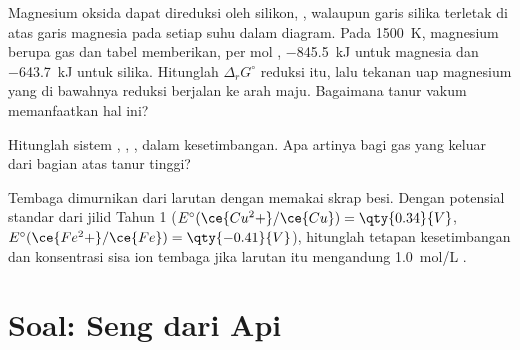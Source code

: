 \begin{exercise}[$\star\star\star$]\label{exo:b2:ellingham:10}
Magnesium oksida dapat direduksi oleh silikon, ,
walaupun garis silika terletak di atas garis magnesia pada setiap suhu
dalam diagram. Pada \qty{1500}{K}, magnesium berupa gas dan tabel
memberikan, per mol , \qty{-845.5}{kJ} untuk magnesia dan
\qty{-643.7}{kJ} untuk silika. Hitunglah $\Delta_r G^\circ$ reduksi itu,
lalu tekanan uap magnesium yang di bawahnya reduksi berjalan ke arah maju.
Bagaimana tanur vakum memanfaatkan hal ini?
\end{exercise}

\begin{exercise}[$\star\star\star$]\label{exo:b2:ellingham:11}
Hitunglah  sistem , , , 
dalam kesetimbangan. Apa artinya bagi gas yang keluar dari bagian atas
tanur tinggi?
\end{exercise}

\begin{exercise}[$\star\star\star$]\label{exo:b2:ellingham:12}
Tembaga dimurnikan dari larutan  dengan  memakai
skrap besi. Dengan potensial standar dari jilid Tahun 1
($E^\circ(\ce{Cu^2+}/\ce{Cu})
= \qty{0.34}{V}$,
$E^\circ(\ce{Fe^2+}/\ce{Fe}) = \qty{-0.41}{V}$), hitunglah tetapan
kesetimbangan  dan konsentrasi sisa ion
tembaga jika larutan itu mengandung \qty{1.0}{mol/L} .
\end{exercise}

\section{Soal: Seng dari Api}

